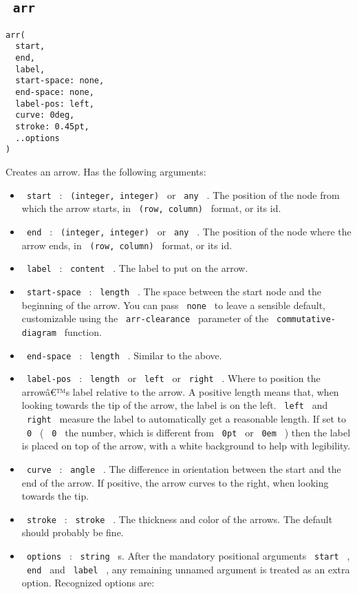 \subsection{\texorpdfstring{\texttt{\ arr\ }}{ arr }}\label{arr}

\begin{verbatim}
arr(
  start,
  end,
  label,
  start-space: none,
  end-space: none,
  label-pos: left,
  curve: 0deg,
  stroke: 0.45pt,
  ..options
)
\end{verbatim}

Creates an arrow. Has the following arguments:

\begin{itemize}
\tightlist
\item
  \texttt{\ start\ } : \texttt{\ (integer,\ integer)\ } or
  \texttt{\ any\ } . The position of the node from which the arrow
  starts, in \texttt{\ (row,\ column)\ } format, or its id.
\item
  \texttt{\ end\ } : \texttt{\ (integer,\ integer)\ } or
  \texttt{\ any\ } . The position of the node where the arrow ends, in
  \texttt{\ (row,\ column)\ } format, or its id.
\item
  \texttt{\ label\ } : \texttt{\ content\ } . The label to put on the
  arrow.
\item
  \texttt{\ start-space\ } : \texttt{\ length\ } . The space between the
  start node and the beginning of the arrow. You can pass
  \texttt{\ none\ } to leave a sensible default, customizable using the
  \texttt{\ arr-clearance\ } parameter of the
  \texttt{\ commutative-diagram\ } function.
\item
  \texttt{\ end-space\ } : \texttt{\ length\ } . Similar to the above.
\item
  \texttt{\ label-pos\ } : \texttt{\ length\ } or \texttt{\ left\ } or
  \texttt{\ right\ } . Where to position the arrowâ€™s label relative to
  the arrow. A positive length means that, when looking towards the tip
  of the arrow, the label is on the left. \texttt{\ left\ } and
  \texttt{\ right\ } measure the label to automatically get a reasonable
  length. If set to \texttt{\ 0\ } ( \texttt{\ 0\ } the number, which is
  different from \texttt{\ 0pt\ } or \texttt{\ 0em\ } ) then the label
  is placed on top of the arrow, with a white background to help with
  legibility.
\item
  \texttt{\ curve\ } : \texttt{\ angle\ } . The difference in
  orientation between the start and the end of the arrow. If positive,
  the arrow curves to the right, when looking towards the tip.
\item
  \texttt{\ stroke\ } : \texttt{\ stroke\ } . The thickness and color of
  the arrows. The default should probably be fine.
\item
  \texttt{\ options\ } : \texttt{\ string\ } s. After the mandatory
  positional arguments \texttt{\ start\ } , \texttt{\ end\ } and
  \texttt{\ label\ } , any remaining unnamed argument is treated as an
  extra option. Recognized options are:


\end{itemize}

